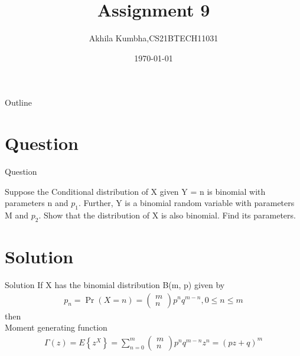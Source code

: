 \documentclass{beamer}
\title{Assignment 9}
\author{Akhila Kumbha,CS21BTECH11031}
\date{\today}
\providecommand{\pr}[1]{\ensuremath{\Pr\left(#1\right)}}
\providecommand{\cbrak}[1]{\ensuremath{\left\{#1\right\}}}
\newcommand{\myvec}[1]{\ensuremath{\begin{pmatrix}#1\end{pmatrix}}}
\begin{document}
\begin{frame}
    \titlepage 
\end{frame}

\logo{}

\begin{frame}{Outline}
    \tableofcontents
\end{frame}


\section{Question}
\begin{frame}{Question}

Suppose the Conditional distribution of X given Y = n is binomial with parameters n and 
$p_1$. Further, Y is a binomial random variable with parameters M and $p_2$. Show that the 
distribution of X is also binomial. Find its parameters.\\ 


\end{frame}


\section{Solution}
\begin{frame}{Solution}
If X has the binomial distribution B(m, p) given by 
\begin{align}
    p_n = \pr{X=n} = \myvec{m \\ n}p^nq^{m-n},0\leq n\leq m
\end{align}
then\\ 
Moment generating function
\begin{align}
    \Gamma(z)=E\cbrak{z^{X}} = \sum_{n=0}^m  \myvec{m \\ n}p^nq^{m-n}z^n=(pz+q)^m 
\end{align}
\end{frame} 
\end{document}
